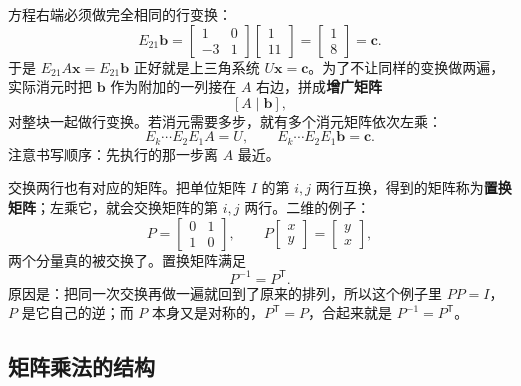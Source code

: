 \documentclass[UTF8,a4paper,12pt]{ctexart}
\numberwithin{equation}{section}
\newcommand{\trans}{^{\mathsf T}}
\begin{document}
	方程右端必须做完全相同的行变换：
	\begin{equation}\label{eq:4.15}
	E_{21}\bm{b}
	=
	\begin{bmatrix}
		1&0\\
		-3&1
	\end{bmatrix}
	\begin{bmatrix}
		1\\11
	\end{bmatrix}
	=
	\begin{bmatrix}
		1\\8
	\end{bmatrix}
	=\bm{c}.
	\end{equation}
	于是 $E_{21}A\bm{x}=E_{21}\bm{b}$ 正好就是上三角系统 $U\bm{x}=\bm{c}$。为了不让同样的变换做两遍，实际消元时把 $\bm{b}$ 作为附加的一列接在 $A$ 右边，拼成\textbf{增广矩阵}
	\begin{equation}\label{eq:4.16}
	[A\mid \bm{b}],
	\end{equation}
	对整块一起做行变换。若消元需要多步，就有多个消元矩阵依次左乘：
	\begin{equation}\label{eq:4.17}
	E_k\cdots E_2E_1A=U,
	\qquad
	E_k\cdots E_2E_1\bm{b}=\bm{c}.
	\end{equation}
	注意书写顺序：先执行的那一步离 $A$ 最近。
	
	交换两行也有对应的矩阵。把单位矩阵 $I$ 的第 $i,j$ 两行互换，得到的矩阵称为\textbf{置换矩阵}；左乘它，就会交换矩阵的第 $i,j$ 两行。二维的例子：
	\begin{equation}\label{eq:4.18}
	P=
	\begin{bmatrix}
		0&1\\
		1&0
	\end{bmatrix},
	\qquad
	P
	\begin{bmatrix}
		x\\y
	\end{bmatrix}
	=
	\begin{bmatrix}
		y\\x
	\end{bmatrix},
	\end{equation}
	两个分量真的被交换了。置换矩阵满足
	\begin{equation}\label{eq:4.19}
	P^{-1}=P\trans.
	\end{equation}
	原因是：把同一次交换再做一遍就回到了原来的排列，所以这个例子里 $PP=I$，$P$ 是它自己的逆；而 $P$ 本身又是对称的，$P\trans=P$，合起来就是 $P^{-1}=P\trans$。
	
	\subsection{矩阵乘法的结构}
	
\end{document}
